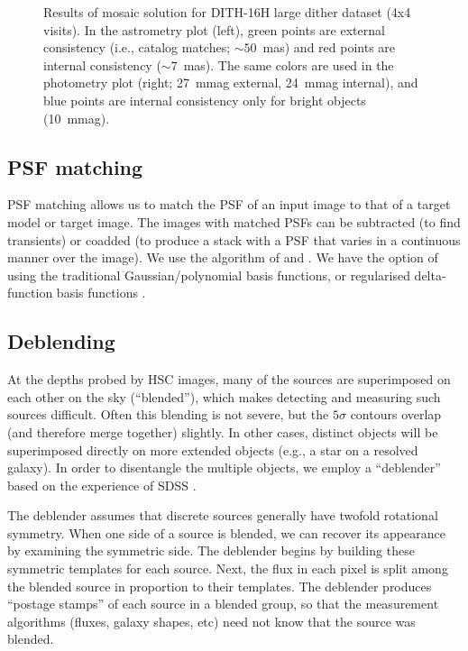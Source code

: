 \documentclass[12pt]{article}
\begin{document}
{\begin{figure}[!htbp]
    \caption{Results of mosaic solution for DITH-16H large dither
      dataset (4x4 visits).  In the astrometry plot (left), green points are external consistency
      (i.e., catalog matches; $\sim 50$~mas) and red points are internal consistency ($\sim 7$~mas).
      The same colors are used in the photometry plot (right; 27~mmag external, 24~mmag internal),
      and blue points are internal consistency only for bright objects (10~mmag).\label{fig:mosaic}}
\end{figure}



\subsection{PSF matching}
\label{alg:psfMatching}

PSF matching allows us to match the PSF of an input image to that of a target model or target image.  The
images with matched PSFs can be subtracted (to find transients) or coadded (to produce a stack with a PSF that
varies in a continuous manner over the image).  We use the algorithm of \citet{1998ApJ...503..325A} and
\citet{2000A&AS..144..363A}.  We have the option of using the traditional \citet{1998ApJ...503..325A}
Gaussian/polynomial basis functions, or regularised delta-function basis functions
\citep{2012MNRAS.425.1341B}.


\subsection{Deblending}
\label{alg:deblender}

At the depths probed by HSC images, many of the sources are superimposed on each other on the sky
(``blended''), which makes detecting and measuring such sources difficult.  Often this blending is not severe,
but the $5\sigma$ contours overlap (and therefore merge together) slightly.  In other cases, distinct objects
will be superimposed directly on more extended objects (e.g., a star on a resolved galaxy).  In order to
disentangle the multiple objects, we employ a ``deblender'' based on the experience of SDSS
\citep{2005ASPC..338..151L}.

The deblender assumes that discrete sources generally have twofold
rotational symmetry.  When one side of a source is blended, we can
recover its appearance by examining the symmetric side.  The deblender
begins by building these symmetric templates for each source.  Next,
the flux in each pixel is split among the blended source in proportion
to their templates.  The deblender produces ``postage stamps'' of each
source in a blended group, so that the measurement algorithms (fluxes,
galaxy shapes, etc) need not know that the source was blended.

}
\end{document}
